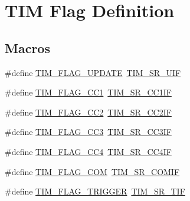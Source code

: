 \hypertarget{group___t_i_m___flag__definition}{}\section{T\+IM Flag Definition}
\label{group___t_i_m___flag__definition}
\subsection*{Macros}
\begin{DoxyCompactItemize}
\item 
\#define \hyperlink{group___t_i_m___flag__definition_gac45ce66cf33b4f324323fc3036917712}{T\+I\+M\+\_\+\+F\+L\+A\+G\+\_\+\+U\+P\+D\+A\+TE}~\hyperlink{group___peripheral___registers___bits___definition_gac8c03fabc10654d2a3f76ea40fcdbde6}{T\+I\+M\+\_\+\+S\+R\+\_\+\+U\+IF}
\item 
\#define \hyperlink{group___t_i_m___flag__definition_gaa7eb8be054b9bd217a9abb1c8687cc55}{T\+I\+M\+\_\+\+F\+L\+A\+G\+\_\+\+C\+C1}~\hyperlink{group___peripheral___registers___bits___definition_ga449a61344a97608d85384c29f003c0e9}{T\+I\+M\+\_\+\+S\+R\+\_\+\+C\+C1\+IF}
\item 
\#define \hyperlink{group___t_i_m___flag__definition_ga9cae242f1c51b31839ffc5bc007c82a7}{T\+I\+M\+\_\+\+F\+L\+A\+G\+\_\+\+C\+C2}~\hyperlink{group___peripheral___registers___bits___definition_ga25a48bf099467169aa50464fbf462bd8}{T\+I\+M\+\_\+\+S\+R\+\_\+\+C\+C2\+IF}
\item 
\#define \hyperlink{group___t_i_m___flag__definition_ga052c380f922219659810e4fceb574a7c}{T\+I\+M\+\_\+\+F\+L\+A\+G\+\_\+\+C\+C3}~\hyperlink{group___peripheral___registers___bits___definition_gad3cf234a1059c0a04799e88382cdc0f2}{T\+I\+M\+\_\+\+S\+R\+\_\+\+C\+C3\+IF}
\item 
\#define \hyperlink{group___t_i_m___flag__definition_gafd0dc57b56941f8b8250d66e289542db}{T\+I\+M\+\_\+\+F\+L\+A\+G\+\_\+\+C\+C4}~\hyperlink{group___peripheral___registers___bits___definition_gacade8a06303bf216bfb03140c7e16cac}{T\+I\+M\+\_\+\+S\+R\+\_\+\+C\+C4\+IF}
\item 
\#define \hyperlink{group___t_i_m___flag__definition_gad454d70205ce5bbf3b3c0e7e43d6df62}{T\+I\+M\+\_\+\+F\+L\+A\+G\+\_\+\+C\+OM}~\hyperlink{group___peripheral___registers___bits___definition_ga91775c029171c4585e9cca6ebf1cd57a}{T\+I\+M\+\_\+\+S\+R\+\_\+\+C\+O\+M\+IF}
\item 
\#define \hyperlink{group___t_i_m___flag__definition_gacacf94fcf8b5ee4287f2d5a56dce91b7}{T\+I\+M\+\_\+\+F\+L\+A\+G\+\_\+\+T\+R\+I\+G\+G\+ER}~\hyperlink{group___peripheral___registers___bits___definition_ga7c8b16f3ced6ec03e9001276b134846e}{T\+I\+M\+\_\+\+S\+R\+\_\+\+T\+IF}

\end{DoxyCompactItemize}
